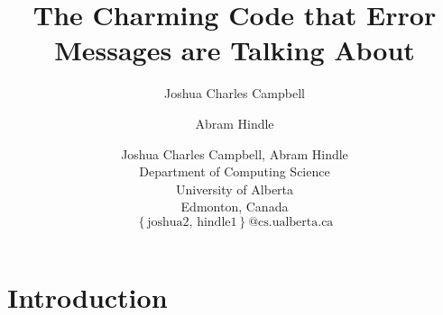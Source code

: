 \documentclass[canadian,12pt]{wlpeerj}
\begin{document}

\title{The Charming Code that Error Messages are Talking About}


\ifpreprint
  \author[1]{Joshua Charles Campbell}
  \author[1]{Abram Hindle}
\else
  \author{Joshua Charles Campbell, Abram Hindle\\
  Department of Computing Science\\
  University of Alberta\\
  Edmonton, Canada\\
  $\left\{ \mbox{joshua2, hindle1}\right\}
  \mbox{@cs.ualberta.ca}$}
%   
\fi


\ifpreprint
  \begin{abstract}
  
  \end{abstract}
\fi




\ifpreprint
{} %
\fi

\maketitle

\ifpreprint
\else
  \begin{abstract}
  
  \end{abstract}
\fi

\section{Introduction}


\balance

\ifpreprint

\else

\fi

\end{document}
